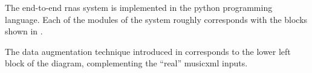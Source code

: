 
The end-to-end \glspl{rna} system is implemented in the
python programming language. Each of the modules of the
system roughly corresponds with the blocks shown in
.


The data augmentation technique introduced in
 corresponds to the
lower left block of the diagram, complementing the ``real''
\gls{musicxml} inputs.
